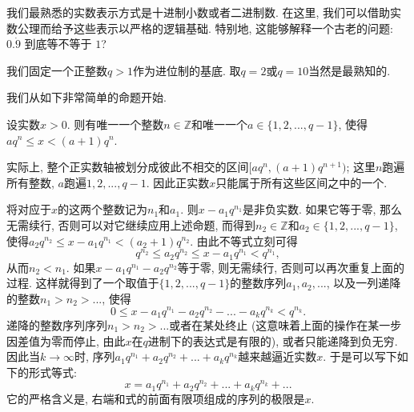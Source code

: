 

我们最熟悉的实数表示方式是十进制小数或者二进制数. 在这里, 我们可以借助实数公理而给予这些表示以严格的逻辑基础. 特别地, 这能够解释一个古老的问题: $0.\dot{9}$ 到底等不等于 $1$?

我们固定一个正整数$q>1$作为进位制的基底. 取$q=2$或$q=10$当然是最熟知的.

我们从如下非常简单的命题开始. 
\begin{lemma}{}
设实数$x>0$. 则有唯一一个整数$n\in\mathbb{Z}$和唯一一个$a\in\{1,2,...,q-1\}$, 使得$aq^n\leq x<(a+1)q^{n}$.
\end{lemma}

实际上, 整个正实数轴被划分成彼此不相交的区间$[aq^n,(a+1)q^{n+1})$; 这里$n$跑遍所有整数, $a$跑遍$1,2,...,q-1$. 因此正实数$x$只能属于所有这些区间之中的一个. 

将对应于$x$的这两个整数记为$n_1$和$a_1$. 则$x-a_1q^{n_1}$是非负实数. 如果它等于零, 那么无需续行, 否则可以对它继续应用上述命题, 而得到$n_2\in\mathbb{Z}$和$a_2\in\{1,2,...,q-1\}$, 使得$a_2q^{n_2}\leq x-a_1q^{n_1}<(a_2+1)q^{n_2}$. 由此不等式立刻可得
\[
q^{n_2}\leq a_2q^{n_2}\leq x-a_1q^{n_1}<q^{n_1},
\]
从而$n_2<n_1$. 如果$x-a_1q^{n_1}-a_2q^{n_2}$等于零, 则无需续行, 否则可以再次重复上面的过程. 这样就得到了一个取值于$\{1,2,...,q-1\}$的整数序列$a_1,a_2,...$, 以及一列递降的整数$n_1>n_2>...$, 使得
\[ 
0\leq x-a_1q^{n_1}-a_2q^{n_2}-...-a_kq^{n_k}<q^{n_k}.
\]
递降的整数序列序列$n_1>n_2>...$或者在某处终止 (这意味着上面的操作在某一步因差值为零而停止, 由此$x$在$q$进制下的表达式是有限的), 或者只能递降到负无穷. 因此当$k\to\infty$时, 序列$a_1q^{n_1}+a_2q^{n_2}+...+a_kq^{n_k}$越来越逼近实数$x$. 于是可以写下如下的形式等式:
\[
x=a_1q^{n_1}+a_2q^{n_2}+...+a_kq^{n_k}+...
\]
它的严格含义是, 右端和式的前面有限项组成的序列的极限是$x$.
